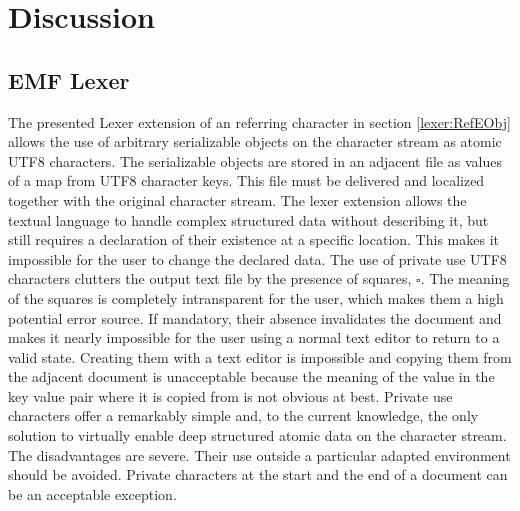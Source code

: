 \chapter{Discussion} \label{cha:discussion}
%
\section{EMF Lexer} \label{sec:EMFLexer} The presented Lexer extension of an referring character in section \ref{lexer:RefEObj} allows the use of arbitrary serializable objects on the character stream as atomic UTF8 characters. The serializable objects are stored in an adjacent file as values of a map from UTF8 character keys. This file must be delivered and localized together with the original character stream. The lexer extension allows the textual language to handle complex structured data without describing it, but still requires a declaration of their existence at a specific location. This makes it impossible for the user to change the declared data. The use of private use UTF8 characters clutters the output text file by the presence of squares, $\square$. The meaning of the squares is completely intransparent for the user, which makes them a high potential error source. If mandatory, their absence invalidates the document and makes it nearly impossible for the user using a normal text editor to return to a valid state. Creating them with a text editor is impossible and copying them from the adjacent document is unacceptable because the meaning of the value in the key value pair where it is copied from is not obvious at best. Private use characters offer a remarkably simple and, to the current knowledge, the only solution to virtually enable deep structured atomic data on the character stream. The disadvantages are severe. Their use outside a particular adapted environment should be avoided. Private characters at the start and the end of a document can be an acceptable exception. 

